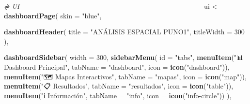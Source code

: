 \documentclass[
]{article}
\newenvironment{Shaded}{\begin{snugshade}}{\end{snugshade}}
\newcommand{\AttributeTok}[1]{\textcolor[rgb]{0.13,0.29,0.53}{#1}}
\newcommand{\CommentTok}[1]{\textcolor[rgb]{0.56,0.35,0.01}{\textit{#1}}}
\newcommand{\DecValTok}[1]{\textcolor[rgb]{0.00,0.00,0.81}{#1}}
\newcommand{\FunctionTok}[1]{\textcolor[rgb]{0.13,0.29,0.53}{\textbf{#1}}}
\newcommand{\NormalTok}[1]{#1}
\newcommand{\OtherTok}[1]{\textcolor[rgb]{0.56,0.35,0.01}{#1}}
\newcommand{\StringTok}[1]{\textcolor[rgb]{0.31,0.60,0.02}{#1}}
\begin{document}
\begin{Shaded}
\begin{Highlighting}[]
\CommentTok{\# UI {-}{-}{-}{-}{-}{-}{-}{-}{-}{-}{-}{-}{-}{-}{-}{-}{-}{-}{-}{-}{-}{-}{-}{-}{-}{-}{-}{-}{-}{-}{-}{-}{-}{-}{-}{-}{-}{-}{-}{-}{-}{-}{-}{-}{-}{-}{-}{-}{-}{-}{-}{-}{-}{-}{-}{-}{-}{-}{-}{-}{-}{-}{-}{-}{-}{-}{-}{-}{-}{-}{-}{-}{-}{-}}
\NormalTok{ui }\OtherTok{\textless{}{-}} \FunctionTok{dashboardPage}\NormalTok{(}
  \AttributeTok{skin =} \StringTok{"blue"}\NormalTok{,}
  
  \FunctionTok{dashboardHeader}\NormalTok{(}
    \AttributeTok{title =} \StringTok{"ANÁLISIS ESPACIAL PUNO1"}\NormalTok{,}
    \AttributeTok{titleWidth =} \DecValTok{300}
\NormalTok{  ),}
  
  \FunctionTok{dashboardSidebar}\NormalTok{(}
    \AttributeTok{width =} \DecValTok{300}\NormalTok{,}
    \FunctionTok{sidebarMenu}\NormalTok{(}
      \AttributeTok{id =} \StringTok{"tabs"}\NormalTok{,}
      \FunctionTok{menuItem}\NormalTok{(}\StringTok{"📊 Dashboard Principal"}\NormalTok{, }\AttributeTok{tabName =} \StringTok{"dashboard"}\NormalTok{, }\AttributeTok{icon =} \FunctionTok{icon}\NormalTok{(}\StringTok{"dashboard"}\NormalTok{)),}
      \FunctionTok{menuItem}\NormalTok{(}\StringTok{"🗺️ Mapas Interactivos"}\NormalTok{, }\AttributeTok{tabName =} \StringTok{"mapas"}\NormalTok{, }\AttributeTok{icon =} \FunctionTok{icon}\NormalTok{(}\StringTok{"map"}\NormalTok{)),}
      \FunctionTok{menuItem}\NormalTok{(}\StringTok{"📋 Resultados"}\NormalTok{, }\AttributeTok{tabName =} \StringTok{"resultados"}\NormalTok{, }\AttributeTok{icon =} \FunctionTok{icon}\NormalTok{(}\StringTok{"table"}\NormalTok{)),}
      \FunctionTok{menuItem}\NormalTok{(}\StringTok{"ℹ️ Información"}\NormalTok{, }\AttributeTok{tabName =} \StringTok{"info"}\NormalTok{, }\AttributeTok{icon =} \FunctionTok{icon}\NormalTok{(}\StringTok{"info{-}circle"}\NormalTok{))}
\NormalTok{    ),}
    

\end{Highlighting}
\end{Shaded}
\end{document}
